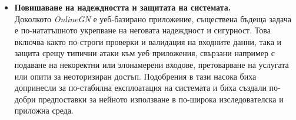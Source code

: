 \begin{itemize}
    \item \textbf{Повишаване на надеждността и защитата на системата.}\\
    Доколкото \textit{OnlineGN} е уеб-базирано приложение, съществена бъдеща задача е по-нататъшното укрепване на неговата надеждност и сигурност. Това включва както по-строги проверки и валидация на входните данни, така и защита срещу типични атаки към уеб приложения, свързани например с подаване на некоректни или злонамерени входове, претоварване на услугата или опити за неоторизиран достъп. Подобрения в тази насока биха допринесли за по-стабилна експлоатация на системата и биха създали по-добри предпоставки за нейното използване в по-широка изследователска и приложна среда.
\end{itemize}